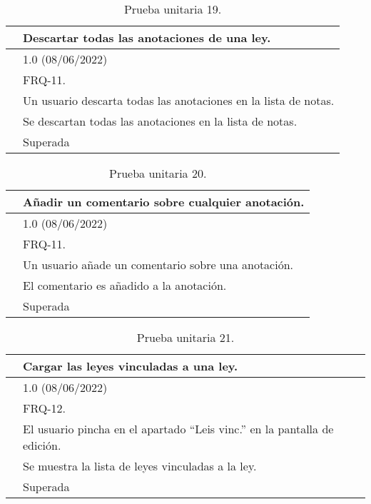 \begin{table}[H]
\begin{center}
\begin{tabular}{|p{3cm}|p{10cm}|} \hline
\centering {\bf PU-19} & Descartar todas las anotaciones de una ley.  \\ \hline\hline
\centering {\bf Versión} & 1.0 (08/06/2022) \\ \hline
\centering {\bf Dependencias} & FRQ-11. \\ \hline
\centering {\bf Descripción} &  Un usuario descarta todas las anotaciones en la lista de notas. \\ \hline
\centering {\bf Criterio de aceptación} & Se descartan todas las anotaciones en la lista de notas. \\ \hline
\centering {\bf Estado} & Superada \\ \hline
\end{tabular}
\caption{Prueba unitaria 19.}
\label{enlacePU19}
\end{center}
\end{table}

\begin{table}[H]
\begin{center}
\begin{tabular}{|p{3cm}|p{10cm}|} \hline
\centering {\bf PU-20} & Añadir un comentario sobre cualquier anotación.  \\ \hline\hline
\centering {\bf Versión} & 1.0 (08/06/2022) \\ \hline
\centering {\bf Dependencias} & FRQ-11. \\ \hline
\centering {\bf Descripción} &  Un usuario añade un comentario sobre una anotación. \\ \hline
\centering {\bf Criterio de aceptación} & El comentario es añadido a la anotación. \\ \hline
\centering {\bf Estado} & Superada \\ \hline
\end{tabular}
\caption{Prueba unitaria 20.}
\label{enlacePU20}
\end{center}
\end{table}

\begin{table}[H]
\begin{center}
\begin{tabular}{|p{3cm}|p{10cm}|} \hline
\centering {\bf PU-21} & Cargar las leyes vinculadas a una ley.  \\ \hline\hline
\centering {\bf Versión} & 1.0 (08/06/2022) \\ \hline
\centering {\bf Dependencias} & FRQ-12. \\ \hline
\centering {\bf Descripción} &  El usuario pincha en el apartado ``Leis vinc.'' en la pantalla de edición. \\ \hline
\centering {\bf Criterio de aceptación} & Se muestra la lista de leyes vinculadas a la ley. \\ \hline
\centering {\bf Estado} & Superada \\ \hline
\end{tabular}
\caption{Prueba unitaria 21.}
\label{enlacePU21}
\end{center}
\end{table}

